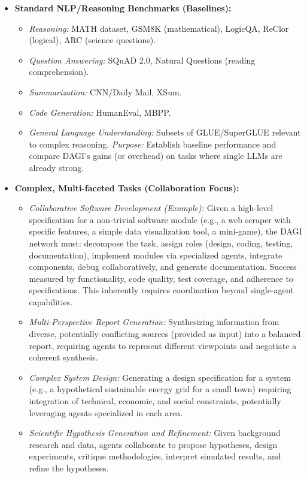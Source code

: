 \documentclass[12pt]{amsart}
\begin{document}
\begin{itemize}[leftmargin=*]
    \item \textbf{Standard NLP/Reasoning Benchmarks (Baselines):}
        \begin{itemize}
            \item \textit{Reasoning:} MATH dataset, GSM8K (mathematical), LogicQA, ReClor (logical), ARC (science questions).
            \item \textit{Question Answering:} SQuAD 2.0, Natural Questions (reading comprehension).
            \item \textit{Summarization:} CNN/Daily Mail, XSum.
            \item \textit{Code Generation:} HumanEval, MBPP.
            \item \textit{General Language Understanding:} Subsets of GLUE/SuperGLUE relevant to complex reasoning.
            \textit{Purpose:} Establish baseline performance and compare DAGI's gains (or overhead) on tasks where single LLMs are already strong.
        \end{itemize}
    \item \textbf{Complex, Multi-faceted Tasks (Collaboration Focus):}
        \begin{itemize}
            \item \textit{Collaborative Software Development (Example):} Given a high-level specification for a non-trivial software module (e.g., a web scraper with specific features, a simple data visualization tool, a mini-game), the DAGI network must: decompose the task, assign roles (design, coding, testing, documentation), implement modules via specialized agents, integrate components, debug collaboratively, and generate documentation. Success measured by functionality, code quality, test coverage, and adherence to specifications. This inherently requires coordination beyond single-agent capabilities.
            \item \textit{Multi-Perspective Report Generation:} Synthesizing information from diverse, potentially conflicting sources (provided as input) into a balanced report, requiring agents to represent different viewpoints and negotiate a coherent synthesis.
            \item \textit{Complex System Design:} Generating a design specification for a system (e.g., a hypothetical sustainable energy grid for a small town) requiring integration of technical, economic, and social constraints, potentially leveraging agents specialized in each area.
            \item \textit{Scientific Hypothesis Generation and Refinement:} Given background research and data, agents collaborate to propose hypotheses, design experiments, critique methodologies, interpret simulated results, and refine the hypotheses.

\end{itemize}
\end{itemize}
\end{document}
